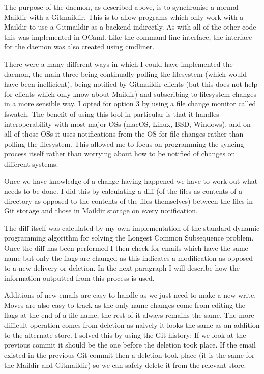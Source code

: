 The purpose of the daemon, as described above, is to synchronise a normal Maildir with a Gitmaildir. This is to allow programs which only work with a Maildir to use a Gitmaildir as a backend indirectly. As with all of the other code this was implemented in OCaml. Like the command-line interface, the interface for the daemon was also created using cmdliner.

There were a many different ways in which I could have implemented the daemon, the main three being continually polling the filesystem (which would have been inefficient), being notified by Gitmaildir clients (but this does not help for clients which only know about Maildir) and subscribing to filesystem changes in a more sensible way. I opted for option 3 by using a file change monitor called fswatch\cite{code_fswatch}. The benefit of using this tool in particular is that it handles interoperability with most major OSs (macOS, Linux, BSD, Windows), and on all of those OSs it uses notifications from the OS for file changes rather than polling the filesystem. This allowed me to focus on programming the syncing process itself rather than worrying about how to be notified of changes on different systems.

Once we have knowledge of a change having happened we have to work out what needs to be done. I did this by calculating a diff (of the files as contents of a directory as opposed to the contents of the files themselves) between the files in Git storage and those in Maildir storage on every notification.

The diff itself was calculated by my own implementation of the standard dynamic programming algorithm for solving the Longest Common Subsequence problem\cite{lcs}. Once the diff has been performed I then check for emails which have the same name but only the flags are changed as this indicates a modification as opposed to a new delivery or deletion. In the next paragraph I will describe how the information outputted from this process is used.

Additions of new emails are easy to handle as we just need to make a new write. Moves are also easy to track as the only name changes come from editing the flags at the end of a file name, the rest of it always remains the same. The more difficult operation comes from deletion as naively it looks the same as an addition to the alternate store. I solved this by using the Git history: If we look at the previous commit it should be the one before the deletion took place. If the email existed in the previous Git commit then a deletion took place (it is the same for the Maildir and Gitmaildir) so we can safely delete it from the relevant store.

